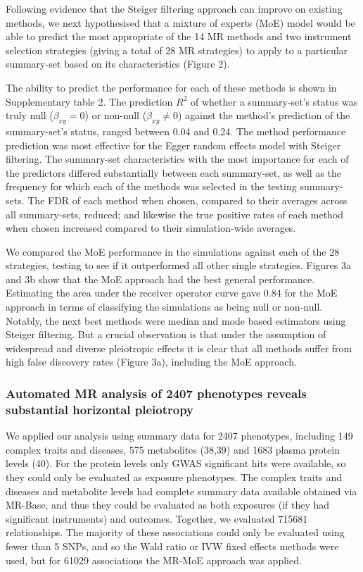 \documentclass[]{article}
\begin{document}
Following evidence that the Steiger filtering approach can improve on
existing methods, we next hypothesised that a mixture of experts (MoE)
model would be able to predict the most appropriate of the 14 MR methods
and two instrument selection strategies (giving a total of 28 MR
strategies) to apply to a particular summary-set based on its
characteristics (Figure 2).

The ability to predict the performance for each of these methods is
shown in Supplementary table 2. The prediction \(R^2\) of whether a
summary-set's status was truly null (\(\beta_{xy}=0\)) or non-null
(\(\beta_{xy} \neq 0\)) against the method's prediction of the
summary-set's status, ranged between 0.04 and 0.24. The method
performance prediction was most effective for the Egger random effects
model with Steiger filtering. The summary-set characteristics with the
most importance for each of the predictors differed substantially
between each summary-set, as well as the frequency for which each of the
methods was selected in the testing summary-sets. The FDR of each method
when chosen, compared to their averages across all summary-sets,
reduced; and likewise the true positive rates of each method when chosen
increased compared to their simulation-wide averages.

We compared the MoE performance in the simulations against each of the
28 strategies, testing to see if it outperformed all other single
strategies. Figures 3a and 3b show that the MoE approach had the best
general performance. Estimating the area under the receiver operator
curve gave 0.84 for the MoE approach in terms of classifying the
simulations as being null or non-null. Notably, the next best methods
were median and mode based estimators using Steiger filtering. But a
crucial observation is that under the assumption of widespread and
diverse pleiotropic effects it is clear that all methods suffer from
high false discovery rates (Figure 3a), including the MoE approach.

\subsubsection{Automated MR analysis of 2407 phenotypes reveals
substantial horizontal
pleiotropy}\label{automated-mr-analysis-of-2407-phenotypes-reveals-substantial-horizontal-pleiotropy}

We applied our analysis using summary data for 2407 phenotypes,
including 149 complex traits and diseases, 575 metabolites (38,39) and
1683 plasma protein levels (40). For the protein levels only GWAS
significant hits were available, so they could only be evaluated as
exposure phenotypes. The complex traits and diseases and metabolite
levels had complete summary data available obtained via MR-Base, and
thus they could be evaluated as both exposures (if they had significant
instruments) and outcomes. Together, we evaluated 715681 relationships.
The majority of these associations could only be evaluated using fewer
than 5 SNPs, and so the Wald ratio or IVW fixed effects methods were
used, but for 61029 associations the MR-MoE approach was applied.
\end{document}
